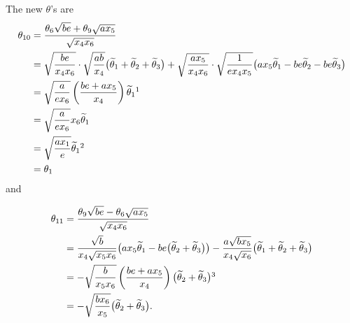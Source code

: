 \documentclass[pdftex]{sigma}
\newcommand{\til}[0]{\widetilde{\theta}}
\numberwithin{equation}{section}
\begin{document}
{$\!\!$The new $\theta$'s are
\begin{align*}
\theta_{10}&=\frac{\theta_6\sqrt{be}+\theta_9\sqrt{ax_5}}{\sqrt{x_4x_6}}\\
&=\sqrt{be\over x_4x_6}\cdot\sqrt{ab\over x_4}\big(\til_1+\til_2+\til_3\big)+\sqrt{ax_5\over x_4x_6}\cdot\sqrt{1\over{ex_4x_5}}\big(ax_5\til_1-be\til_2-be\til_3\big)\\
&=\sqrt{a\over ex_6}\left(be+ax_5\over x_4\right)\til_1\footnotemark
\\
&=\sqrt{a\over ex_6}x_6\til_1\\
&=\sqrt{ax_1\over e}\til_1\footnotemark\\
&=\theta_1
\end{align*}
and
\addtocounter{footnote}{-1}
\addtocounter{footnote}{+1}
\begin{align*}
\theta_{11}&=\frac{\theta_9\sqrt{be}-\theta_6\sqrt{ax_5}}{\sqrt{x_4x_6}}\\
&={\sqrt{b}\over x_4\sqrt{x_5x_6}}\big( a x_5 \widetilde{\theta}_1 - be \big(\widetilde{\theta}_2 + \widetilde{\theta}_3\big) \big)-{a\sqrt{bx_5}\over x_4\sqrt{x_6}}\big(\til_1+\til_2+\til_3\big)\\
&=-\sqrt{b\over x_5x_6}\left(be+ax_5\over x_4\right)\big(\til_2+\til_3\big)\footnotemark\\
&=-\sqrt{b x_6\over x_5}\big(\til_2+\til_3\big).
\end{align*}

}
\end{document}
